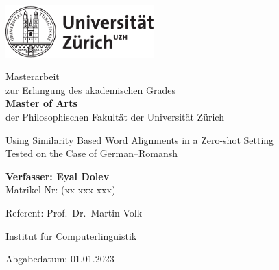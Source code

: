 \begin{titlepage}
\includegraphics[height=20mm]{graphics/uzh_logo_d_pos}\\

\begin{center}

{
Masterarbeit \\
zur Erlangung des akademischen Grades \\
\textbf{Master of Arts} \\
der Philosophischen Fakultät der Universität Zürich \\

\vspace{2cm}

{\Huge Using Similarity Based Word Alignments in a Zero-shot Setting}\\
\vspace{0.5cm}
{\huge Tested on the Case of German--Romansh}\\

\vspace{4cm}

\textbf{Verfasser: Eyal Dolev} \\
	Matrikel-Nr: (xx-xxx-xxx) \\

\vspace{2cm}

Referent: Prof.~Dr.~Martin Volk


Institut für Computerlinguistik

\vfill Abgabedatum: 01.01.2023

\vspace{3cm}
}
\end{center}

\end{titlepage}

\newpage
